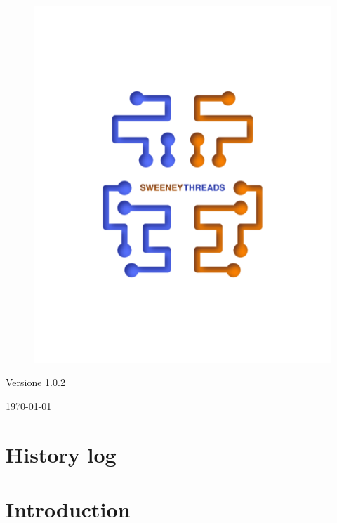 \documentclass[a4paper]{article}
\begin{document}
\begin{titlepage}
		\begin{figure}[H]
			\centering
			\includegraphics[scale=0.8]{sweeney.png}
		\end{figure}
		\begin{center}
			Versione 1.0.2
		\end{center}
		{\large \today}\\[3cm] 
		\vfill  
	\end{titlepage}
	
	
	\tableofcontents
	
	\newpage
	\section*{History log}

	\newpage 
    \section{Introduction}
\end{document}
